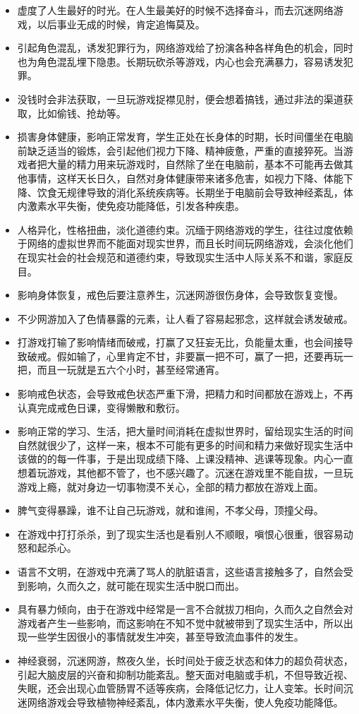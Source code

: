 \begin{itemize}
    \item 虚度了人生最好的时光。在人生最美好的时候不选择奋斗，而去沉迷网络游戏，以后事业无成的时候，肯定追悔莫及。
    \item 引起角色混乱，诱发犯罪行为，网络游戏给了扮演各种各样角色的机会，同时也为角色混乱埋下隐患。长期玩砍杀等游戏，内心也会充满暴力，容易诱发犯罪。
    \item 没钱时会非法获取，一旦玩游戏捉襟见肘，便会想着搞钱，通过非法的渠道获取，比如偷钱、抢劫等。
    \item 损害身体健康，影响正常发育，学生正处在长身体的时期，长时间僵坐在电脑前缺乏适当的锻炼，会引起他们视力下降、精神疲惫，严重的直接猝死。当游戏者把大量的精力用来玩游戏时，自然除了坐在电脑前，基本不可能再去做其他事情，这样天长日久，自然对身体健康带来诸多危害，如视力下降、体能下降、饮食无规律导致的消化系统疾病等。长期坐于电脑前会导致神经紊乱，体内激素水平失衡，使免疫功能降低，引发各种疾患。
    \item 人格异化，性格扭曲，淡化道德约束。沉缅于网络游戏的学生，往往过度依赖于网络的虚拟世界而不能面对现实世界，而且长时间玩网络游戏，会淡化他们在现实社会的社会规范和道德约束，导致现实生活中人际关系不和谐，家庭反目。
    \item 影响身体恢复，戒色后要注意养生，沉迷网游很伤身体，会导致恢复变慢。
    \item 不少网游加入了色情暴露的元素，让人看了容易起邪念，这样就会诱发破戒。
    \item 打游戏打输了影响情绪而破戒，打赢了又狂妄无比，负能量太重，也会间接导致破戒。假如输了，心里肯定不甘，非要赢一把不可，赢了一把，还要再玩一把，而且一玩就是五六个小时，甚至经常通宵。
    \item 影响戒色状态，会导致戒色状态严重下滑，把精力和时间都放在游戏上，不再认真完成戒色日课，变得懒散和敷衍。
    \item 影响正常的学习、生活，把大量时间消耗在虚拟世界时，留给现实生活的时间自然就很少了，这样一来，根本不可能有更多的时间和精力来做好现实生活中该做的的每一件事，于是出现成绩下降、上课没精神、逃课等现象。内心一直想着玩游戏，其他都不管了，也不感兴趣了。沉迷在游戏里不能自拔，一旦玩游戏上瘾，就对身边一切事物漠不关心，全部的精力都放在游戏上面。
    \item 脾气变得暴躁，谁不让自己玩游戏，就和谁闹，不孝父母，顶撞父母。
    \item 在游戏中打打杀杀，到了现实生活也是看别人不顺眼，嗔恨心很重，很容易动怒和起杀心。
    \item 语言不文明，在游戏中充满了骂人的肮脏语言，这些语言接触多了，自然会受到影响，久而久之，就可能在现实生活中脱口而出。
    \item 具有暴力倾向，由于在游戏中经常是一言不合就拔刀相向，久而久之自然会对游戏者产生一些影响，而这影响在不知不觉中就被带到了现实生活中，所以出现一些学生因很小的事情就发生冲突，甚至导致流血事件的发生。
    \item 神经衰弱，沉迷网游，熬夜久坐，长时间处于疲乏状态和体力的超负荷状态，引起大脑皮层的兴奋和抑制功能紊乱。整天面对电脑或手机，不但导致近视、失眠，还会出现心血管肠胃不适等疾病，会降低记忆力，让人变笨。长时间沉迷网络游戏会导致植物神经紊乱，体内激素水平失衡，使人免疫功能降低。
\end{itemize}

